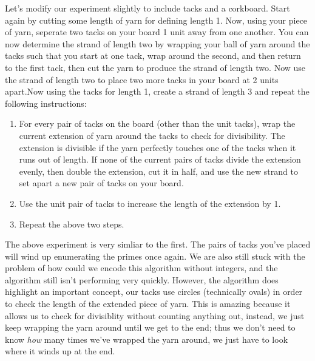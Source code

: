 \documentclass[a4paper,12pt]{article}
\begin{document}
Let's modify our experiment slightly to include tacks and a corkboard. Start again by cutting some length of yarn for defining length 1. Now, using your piece of yarn, seperate two tacks on your board 1 unit away from one another. You can now determine the strand of length two by wrapping your ball of yarn around the tacks such that you start at one tack, wrap around the second, and then return to the first tack, then cut the yarn to produce the strand of length two. Now use the strand of length two to place two more tacks in your board at 2 units apart.Now using the tacks for length 1, create a strand of length 3 and repeat the following instructions:   
\begin{enumerate}
\item For every pair of tacks on the board (other than the unit tacks), wrap the current extension of yarn around the tacks to check for divisibility. The extension is divisible if the yarn perfectly touches one of the tacks when it runs out of length. If none of the current pairs of tacks divide the extension evenly, then double the extension, cut it in half, and use the new strand to set apart a new pair of tacks on your board.
\item Use the unit pair of tacks to increase the length of the extension by 1.
\item Repeat the above two steps.
\end{enumerate} 
The above experiment is very simliar to the first. The pairs of tacks you've placed will wind up enumerating the primes once again. We are also still stuck with the problem of how could we encode this algorithm without integers, and the algorithm still isn't performing very quickly. However, the algorithm does highlight an important concept, our tacks use circles (technically ovals) in order to check the length of the extended piece of yarn. This is amazing because it allows us to check for divisiblity without counting anything out, instead, we just keep wrapping the yarn around until we get to the end; thus we don't need to know \textit{how} many times we've wrapped the yarn around, we just have to look where it winds up at the end.   
\end{document}

